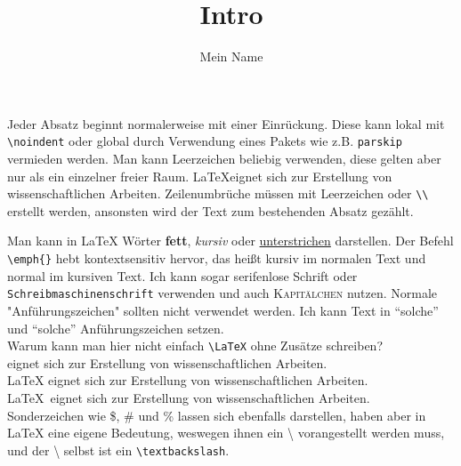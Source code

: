 \documentclass[11pt,a4paper]{article}
\title{Intro}
\author{Mein Name}
\begin{document}
\maketitle %

Jeder Absatz beginnt normalerweise mit einer Einrückung. Diese kann lokal mit \verb|\noindent| oder global durch Verwendung eines Pakets wie z.B. \verb|parskip| vermieden werden.
Man kann Leerzeichen     beliebig     verwenden, diese gelten aber nur als ein einzelner freier Raum. \LaTeX     eignet sich zur Erstellung von wissenschaftlichen Arbeiten.
Zeilenumbrüche müssen mit Leerzeichen oder \verb|\\| erstellt werden, ansonsten wird der Text zum bestehenden Absatz gezählt.

Man kann in \LaTeX{} Wörter \textbf{fett}, \textit{kursiv} oder \underline{unterstrichen} darstellen.  Der Befehl \verb|\emph{}| hebt kontextsensitiv hervor, das heißt kursiv im normalen Text und normal im kursiven Text. Ich kann sogar \textsf{serifenlose Schrift} oder \texttt{Schreibmaschinenschrift} verwenden und auch \textsc{Kapitälchen} nutzen. Normale "Anführungszeichen" sollten nicht verwendet werden. Ich kann Text in "`solche"' und ``solche'' Anführungszeichen setzen.\\

\noindent Warum kann man hier nicht einfach \verb|\LaTeX| ohne Zusätze schreiben?\\

\noindent{\LaTeX } eignet sich zur Erstellung von wissenschaftlichen Arbeiten.\\
\noindent\LaTeX{} eignet sich zur Erstellung von wissenschaftlichen Arbeiten.\\
\noindent\LaTeX\ eignet sich zur Erstellung von wissenschaftlichen Arbeiten.\\

Sonderzeichen wie \$, \# und \% lassen sich ebenfalls darstellen, haben aber in \LaTeX{} eine eigene Bedeutung, weswegen ihnen ein \textbackslash{} vorangestellt werden muss, und der \textbackslash{} selbst ist ein \verb|\textbackslash|.
\end{document}
